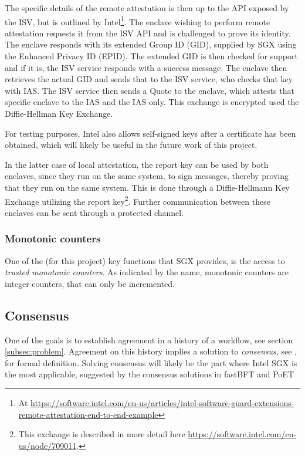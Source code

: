 \documentclass[12pt]{article}
\begin{document}
			The specific details of the remote attestation is then up to the API exposed by the ISV, but is outlined by Intel\footnote{At \url{https://software.intel.com/en-us/articles/intel-software-guard-extensions-remote-attestation-end-to-end-example}}.
			The enclave wishing to perform remote attestation requests it from the ISV API and is challenged to prove its identity.
			The enclave responds with its extended Group ID (GID), supplied by SGX using the Enhanced Privacy ID (EPID).
			The extended GID is then checked for support and if it is, the ISV service responds with a success message.
			The enclave then retrieves the actual GID and sends that to the ISV service, who checks that key with IAS.
			The ISV service then sends a Quote to the enclave, which attests that specific enclave to the IAS and the IAS only.
			This exchange is encrypted used the Diffie-Hellman Key Exchange. 

			For testing purposes, Intel also allows self-signed keys after a certificate has been obtained, which will likely be useful in the future work of this project.

			In the latter case of local attestation, the report key can be used by both enclaves, since they run on the same system, to sign messages, thereby proving that they run on the same system.
			This is done through a Diffie-Hellmann Key Exchange utilizing the report key\footnote{This exchange is described in more detail here \url{https://software.intel.com/en-us/node/709011}.}.
			Further communication between these enclaves can be sent through a protected channel.

			\subsubsection{Monotonic counters}
			One of the (for this project) key functions that SGX provides, is the access to \textit{trusted monotonic counters}.
			As indicated by the name, monotonic counters are integer counters, that can only be incremented.
			

		\subsection{Consensus}
		One of the goals is to establish agreement in a history of a workflow, see section \ref{subsec:problem}. Agreement on this history implies a solution to \textit{consensus}, see \cite{mds-book}, for formal definition.
		Solving consensus will likely be the part where Intel SGX is the most applicable, suggested by the consensus solutions in fastBFT \cite{fastbft} and PoET \cite{poet}
\end{document}
